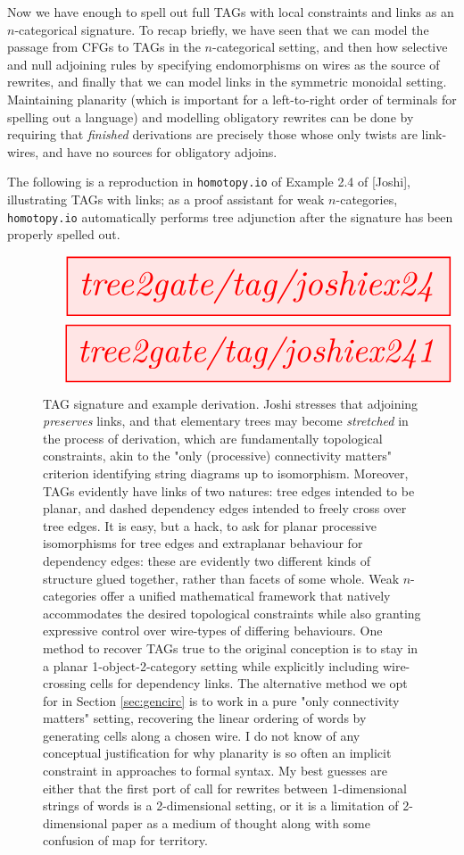 Now we have enough to spell out full TAGs with local constraints and links as an $n$-categorical signature. To recap briefly, we have seen that we can model the passage from CFGs to TAGs in the $n$-categorical setting, and then how selective and null adjoining rules by specifying endomorphisms on wires as the source of rewrites, and finally that we can model links in the symmetric monoidal setting. Maintaining planarity (which is important for a left-to-right order of terminals for spelling out a language) and modelling obligatory rewrites can be done by requiring that \emph{finished} derivations are precisely those whose only twists are link-wires, and have no sources for obligatory adjoins.

\begin{example}
The following is a reproduction in \texttt{homotopy.io} of Example 2.4 of [Joshi], illustrating TAGs with links; as a proof assistant for weak $n$-categories, \texttt{homotopy.io} automatically performs tree adjunction after the signature has been properly spelled out.

\begin{figure}[h!]
\centering
\[\resizebox{\textwidth}{!}{\tikzfig{tree2gate/tag/joshiex24}}\]
\[\resizebox{\textwidth}{!}{\tikzfig{tree2gate/tag/joshiex241}}\]
\caption{TAG signature and example derivation. Joshi stresses that adjoining \emph{preserves} links, and that elementary trees may become \emph{stretched} in the process of derivation, which are fundamentally topological constraints, akin to the "only (processive) connectivity matters" criterion identifying string diagrams up to isomorphism. Moreover, TAGs evidently have links of two natures: tree edges intended to be planar, and dashed dependency edges intended to freely cross over tree edges. It is easy, but a hack, to ask for planar processive isomorphisms for tree edges and extraplanar behaviour for dependency edges: these are evidently two different kinds of structure glued together, rather than facets of some whole. Weak $n$-categories offer a unified mathematical framework that natively accommodates the desired topological constraints while also granting expressive control over wire-types of differing behaviours. One method to recover TAGs true to the original conception is to stay in a planar 1-object-2-category setting while explicitly including wire-crossing cells for dependency links. The alternative method we opt for in Section \ref{sec:gencirc} is to work in a pure "only connectivity matters" setting, recovering the linear ordering of words by generating cells along a chosen wire. I do not know of any conceptual justification for why planarity is so often an implicit constraint in approaches to formal syntax. My best guesses are either that the first port of call for rewrites between 1-dimensional strings of words is a 2-dimensional setting, or it is a limitation of 2-dimensional paper as a medium of thought along with some confusion of map for territory.}
\end{figure}


\end{example}
